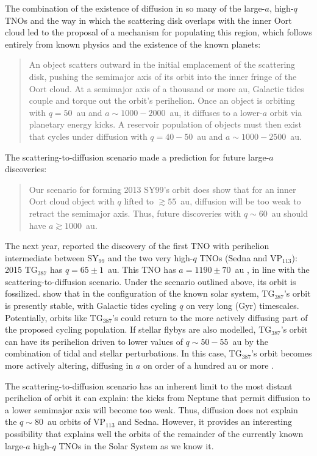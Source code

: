 \documentclass[preprint]{aastex62}
\begin{document}
The combination of the existence of diffusion in so many of the large-$a$, high-$q$ TNOs and the way in which the scattering disk overlaps with the inner Oort cloud led \citet{bannister17} to the proposal of a mechanism for populating this region, which follows entirely from known physics and the existence of the known planets:
\begin{quote}
An object scatters outward in the initial emplacement of the scattering disk, pushing the semimajor axis of its orbit into the inner fringe of the Oort cloud. At a semimajor axis of a thousand or more au, Galactic tides couple and torque out the orbit's perihelion. Once an object is orbiting with $q = 50$~au and $a\sim1000-2000$~au, it diffuses to a lower-$a$ orbit via planetary energy kicks. A reservoir population of objects must then exist that cycles under diffusion with $q = 40-50$~au and $a\sim1000-2500$~au.
\end{quote}
The scattering-to-diffusion scenario made a prediction for future large-$a$ discoveries: 
\begin{quote}
    Our scenario for forming 2013 SY99's orbit does show that for an inner Oort cloud object with $q$ lifted to $\gtrsim 55$~au, diffusion will be too weak to retract the semimajor axis. Thus, future discoveries with $q\sim60$~au should have $a \gtrsim 1000$~au.
\end{quote}
The next year, \citet{sheppard18} reported the discovery of the first TNO with perihelion intermediate between SY$_{99}$ and the two very high-$q$ TNOs (Sedna and VP$_{113}$): 2015 TG$_{387}$ has $q=65 \pm 1$~au. 
This TNO has $a = 1190 \pm 70$~au \citep{sheppard18}, in line with the scattering-to-diffusion scenario.
Under the scenario outlined above, its orbit is fossilized. \citet{sheppard18} show that in the  configuration of the known solar system, TG$_{387}$'s orbit is presently stable, with Galactic tides cycling $q$ on very long (Gyr) timescales.
Potentially, orbits like TG$_{387}$'s could return to the more actively diffusing part of the proposed cycling population.
If stellar flybys are also modelled, TG$_{387}$'s orbit can have its perihelion driven to lower values of $q \sim 50-55$~au by the combination of tidal and stellar perturbations. In this case, TG$_{387}$'s orbit becomes more actively altering, diffusing in $a$ on order of a hundred au or more \citep{sheppard18}. 

The scattering-to-diffusion scenario has an inherent limit to the most distant perihelion of orbit it can explain: the kicks from Neptune that permit diffusion to a lower semimajor axis will become too weak. 
Thus, diffusion does not explain the $q \sim 80$~au orbits of VP$_{113}$ and Sedna. 
However, it provides an interesting possibility that explains well the orbits of the remainder of the currently known large-$a$ high-$q$ TNOs in the Solar System as we know it.
\end{document}

